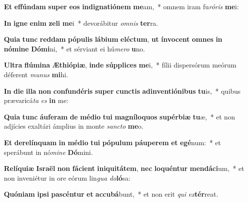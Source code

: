 \item \textbf{Et} \textbf{ef}\textbf{fún}\textbf{dam} \textbf{su}\textbf{per} \textbf{e}\textbf{os} \textbf{in}\textbf{di}\textbf{gna}\textbf{ti}\textbf{ó}\textbf{nem} \textbf{me}am,~* omnem iram fu\textit{ró}\textit{ris} \textbf{me}i:
\item \textbf{In} \textbf{i}\textbf{gne} \textbf{e}\textbf{nim} \textbf{ze}\textbf{li} \textbf{me}i~* devorábitur \textit{om}\textit{nis} \textbf{ter}ra.
\item \textbf{Qui}\textbf{a} \textbf{tunc} \textbf{red}\textbf{dam} \textbf{pó}\textbf{pu}\textbf{lis} \textbf{lá}\textbf{bi}\textbf{um} \textbf{e}\textbf{léc}\textbf{tum}, \textbf{ut} \textbf{ín}\textbf{vo}\textbf{cent} \textbf{om}\textbf{nes} \textbf{in} \textbf{nó}\textbf{mi}\textbf{ne} \textbf{Dó}\textbf{mi}ni,~* et sérviant ei hú\textit{me}\textit{ro} \textbf{u}no.
\item \textbf{Ul}\textbf{tra} \textbf{flú}\textbf{mi}\textbf{na} \textbf{Æ}\textbf{thi}\textbf{ó}\textbf{pi}\textbf{æ}, \textbf{in}\textbf{de} \textbf{súp}\textbf{pli}\textbf{ces} \textbf{me}i,~* fílii dispersórum meórum déferent \textit{mu}\textit{nus} \textbf{mi}hi.
\item \textbf{In} \textbf{di}\textbf{e} \textbf{il}\textbf{la} \textbf{non} \textbf{con}\textbf{fun}\textbf{dé}\textbf{ris} \textbf{su}\textbf{per} \textbf{cunc}\textbf{tis} \textbf{ad}\textbf{in}\textbf{ven}\textbf{ti}\textbf{ó}\textbf{ni}\textbf{bus} \textbf{tu}is,~* quibus prævaricá\textit{ta} \textit{es} \textbf{in} me:
\item \textbf{Qui}\textbf{a} \textbf{tunc} \textbf{áu}\textbf{fe}\textbf{ram} \textbf{de} \textbf{mé}\textbf{di}\textbf{o} \textbf{tu}\textbf{i} \textbf{ma}\textbf{gní}\textbf{lo}\textbf{quos} \textbf{su}\textbf{pér}\textbf{bi}\textbf{æ} \textbf{tu}æ,~* et non adjícies exaltári ámplius in monte \textit{sanc}\textit{to} \textbf{me}o.
\item \textbf{Et} \textbf{de}\textbf{re}\textbf{lín}\textbf{quam} \textbf{in} \textbf{mé}\textbf{di}\textbf{o} \textbf{tu}\textbf{i} \textbf{pó}\textbf{pu}\textbf{lum} \textbf{páu}\textbf{pe}\textbf{rem} \textbf{et} \textbf{e}\textbf{gé}num:~* et sperábunt in nó\textit{mi}\textit{ne} \textbf{Dó}mini.
\item \textbf{Re}\textbf{lí}\textbf{qui}\textbf{æ} \textbf{Is}\textbf{ra}\textbf{ël} \textbf{non} \textbf{fá}\textbf{ci}\textbf{ent} \textbf{in}\textbf{i}\textbf{qui}\textbf{tá}\textbf{tem}, \textbf{nec} \textbf{lo}\textbf{quén}\textbf{tur} \textbf{men}\textbf{dá}\textbf{ci}um,~* et non inveniétur in ore eórum lin\textit{gua} \textit{do}\textbf{ló}sa:
\item \textbf{Quón}\textbf{i}\textbf{am} \textbf{ip}\textbf{si} \textbf{pa}\textbf{scén}\textbf{tur} \textbf{et} \textbf{ac}\textbf{cu}\textbf{bá}bunt,~* et non erit \textit{qui} \textit{ex}\textbf{tér}reat.
